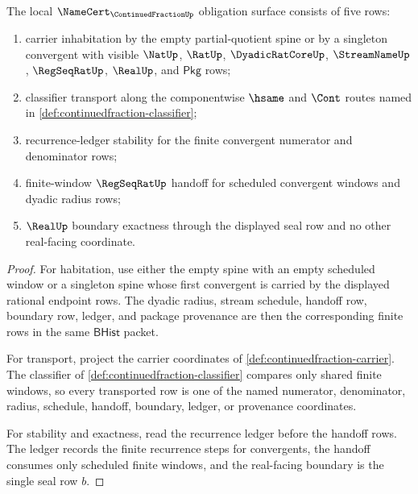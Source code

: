 \begin{theorem}
\label{thm:continuedfraction-namecert-obligations}
The local $\NameCert_{\ContinuedFractionUp}$ obligation surface consists of
five rows:
\begin{enumerate}
\item carrier inhabitation by the empty partial-quotient spine or by a
singleton convergent with visible $\NatUp$, $\RatUp$, $\DyadicRatCoreUp$,
$\StreamNameUp$, $\RegSeqRatUp$, $\RealUp$, and $\mathsf{Pkg}$ rows;
\item classifier transport along the componentwise $\hsame$ and $\Cont$ routes
named in \autoref{def:continuedfraction-classifier};
\item recurrence-ledger stability for the finite convergent numerator and
denominator rows;
\item finite-window $\RegSeqRatUp$ handoff for scheduled convergent windows
and dyadic radius rows;
\item $\RealUp$ boundary exactness through the displayed seal row and no other
real-facing coordinate.
\end{enumerate}
\end{theorem}
\begin{proof}
For habitation, use either the empty spine with an empty scheduled window or a
singleton spine whose first convergent is carried by the displayed rational
endpoint rows. The dyadic radius, stream schedule, handoff row, boundary row,
ledger, and package provenance are then the corresponding finite rows in the
same $\mathsf{BHist}$ packet.

For transport, project the carrier coordinates of
\autoref{def:continuedfraction-carrier}. The classifier of
\autoref{def:continuedfraction-classifier} compares only shared finite
windows, so every transported row is one of the named numerator, denominator,
radius, schedule, handoff, boundary, ledger, or provenance coordinates.

For stability and exactness, read the recurrence ledger before the handoff
rows. The ledger records the finite recurrence steps for convergents, the
handoff consumes only scheduled finite windows, and the real-facing boundary
is the single seal row $b$.
\end{proof}

